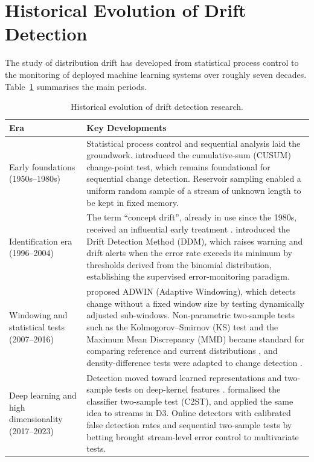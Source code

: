 \section{Historical Evolution of Drift Detection}
\label{sec:lit-history}
The study of distribution drift has developed from statistical process control to the monitoring of deployed machine learning systems over roughly seven decades. Table~\ref{tab:timeline} summarises the main periods.

\begin{table}[!htbp]
\centering
\caption[Historical evolution of drift detection research]{Historical evolution of drift detection research.}
\label{tab:timeline}
\small
\begin{tabular}{>{\raggedright\arraybackslash}p{3.4cm}>{\raggedright\arraybackslash}p{10.4cm}}
\toprule
Era & Key Developments \\
\midrule
Early foundations (1950s--1980s) & Statistical process control and sequential analysis laid the groundwork. \citet{Page1954} introduced the cumulative-sum (CUSUM) change-point test, which remains foundational for sequential change detection. Reservoir sampling \citep{Vitter1985} enabled a uniform random sample of a stream of unknown length to be kept in fixed memory. \\
\addlinespace
Identification era (1996--2004) & The term ``concept drift'', already in use since the 1980s, received an influential early treatment \citep{WidmerKubat1996}. \citet{Gama2004} introduced the Drift Detection Method (DDM), which raises warning and drift alerts when the error rate exceeds its minimum by thresholds derived from the binomial distribution, establishing the supervised error-monitoring paradigm. \\
\addlinespace
Windowing and statistical tests (2007--2016) & \citet{BifetGavalda2007} proposed ADWIN (Adaptive Windowing), which detects change without a fixed window size by testing dynamically adjusted sub-windows. Non-parametric two-sample tests such as the Kolmogorov--Smirnov (KS) test and the Maximum Mean Discrepancy (MMD) became standard for comparing reference and current distributions \citep{Rabanser2019, Gretton2012}, and density-difference tests were adapted to change detection \citep{Bu2017, Bu2018}. \\
\addlinespace
Deep learning and high dimensionality (2017--2023) & Detection moved toward learned representations \citep{Rabanser2019} and two-sample tests on deep-kernel features \citep{Liu2020}. \citet{LopezPazOquab2017} formalised the classifier two-sample test (C2ST), and \citet{Gozuacik2019} applied the same idea to streams in D3. Online detectors with calibrated false detection rates \citep{CobbSequential2022} and sequential two-sample tests by betting \citep{PodkopaevRamdas2023} brought stream-level error control to multivariate tests. \\

\end{tabular}
\end{table}
